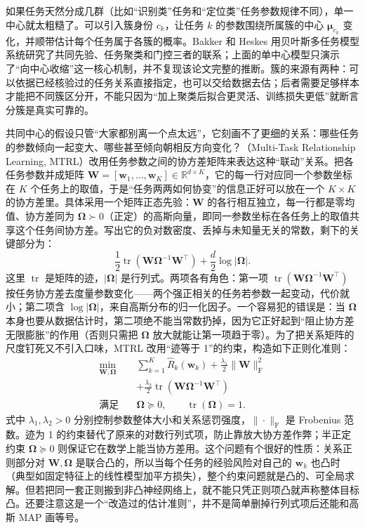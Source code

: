 如果任务天然分成几群（比如“识别类”任务和“定位类”任务参数规律不同），单一中心就太粗糙了。可以引入簇身份 $c_k$，让任务 $k$ 的参数围绕所属簇的中心 $\bm\mu_{c_k}$ 变化，并顺带估计每个任务属于各簇的概率。Bakker 和 Heskes 用贝叶斯多任务模型系统研究了共同先验、任务聚类和门控三者的联系；上面的单中心模型只演示了“向中心收缩”这一核心机制，并不复现该论文完整的推断。簇的来源有两种：可以依据已经核验过的任务关系直接指定，也可以交给数据去估；后者需要足够样本才能把不同簇区分开，不能只因为“加上聚类后拟合更灵活、训练损失更低”就断言分簇是真实可靠的。

共同中心的假设只管“大家都别离一个点太远”，它刻画不了更细的关系：哪些任务的参数倾向一起变大、哪些甚至倾向朝相反方向变化？（Multi-Task Relationship Learning, MTRL）改用任务参数之间的协方差矩阵来表达这种“联动”关系。把各任务参数并成矩阵 $\bm W=[\bm w_1,\ldots,\bm w_K]\in\mathbb R^{d\times K}$，它的每一行对应同一个参数坐标在 $K$ 个任务上的取值，于是“任务两两如何协变”的信息正好可以放在一个 $K\times K$ 的协方差里。具体采用一个矩阵正态先验：$\bm W$ 的各行相互独立，每一行都是零均值、协方差同为 $\bm\Omega\succ0$（正定）的高斯向量，即同一参数坐标在各任务上的取值共享这个任务间协方差。写出它的负对数密度、丢掉与未知量无关的常数，剩下的关键部分为：
\begin{equation}
  \frac12\operatorname{tr}
    (\bm W\bm\Omega^{-1}\bm W^{\top})
  +\frac d2\log|\bm\Omega|.
  \label{eq:ket-sharing-matrix-prior}
\end{equation}
这里 $\operatorname{tr}$ 是矩阵的迹，$|\bm\Omega|$ 是行列式。两项各有角色：第一项 $\operatorname{tr}(\bm W\bm\Omega^{-1}\bm W^\top)$ 按任务协方差去度量参数变化——两个强正相关的任务若参数一起变动，代价就小；第二项含 $\log|\bm\Omega|$，来自高斯分布的归一化因子。一个容易犯的错误是：当 $\bm\Omega$ 本身也要从数据估计时，第二项绝不能当常数扔掉，因为它正好起到“阻止协方差无限膨胀”的作用（否则只需把 $\bm\Omega$ 放大就能让第一项趋于零）。为了把关系矩阵的尺度钉死又不引入口味，MTRL 改用“迹等于 1”的约束，构造如下正则化准则：
\begin{align}
  \min_{\bm W,\bm\Omega}\quad&
  \sum_{k=1}^{K}\hat R_k(\bm w_k)
  +\frac{\lambda_1}{2}\|\bm W\|_{\mathrm F}^2
  \nonumber\\
  &+\frac{\lambda_2}{2}
    \operatorname{tr}(\bm W\bm\Omega^{-1}\bm W^{\top})
  \nonumber\\
  \text{满足}\quad&
  \bm\Omega\succeq0,
  \qquad \operatorname{tr}(\bm\Omega)=1.
  \label{eq:ket-sharing-mtrl}
\end{align}
式中 $\lambda_1,\lambda_2>0$ 分别控制参数整体大小和关系惩罚强度，$\|\cdot\|_{\mathrm F}$ 是 Frobenius 范数。迹为 1 的约束替代了原来的对数行列式项，防止靠放大协方差作弊；半正定约束 $\bm\Omega\succeq0$ 则保证它在数学上能当协方差用。这个问题有个很好的性质：关系正则部分对 $\bm W,\bm\Omega$ 是联合凸的，所以当每个任务的经验风险对自己的 $\bm w_k$ 也凸时（典型如固定特征上的线性模型加平方损失），整个约束问题就是凸的、可全局求解。但若把同一套正则搬到非凸神经网络上，就不能只凭正则项凸就声称整体目标凸。还要注意这是一个“改造过的估计准则”，并不是简单删掉行列式项后还能和高斯 MAP 画等号。

